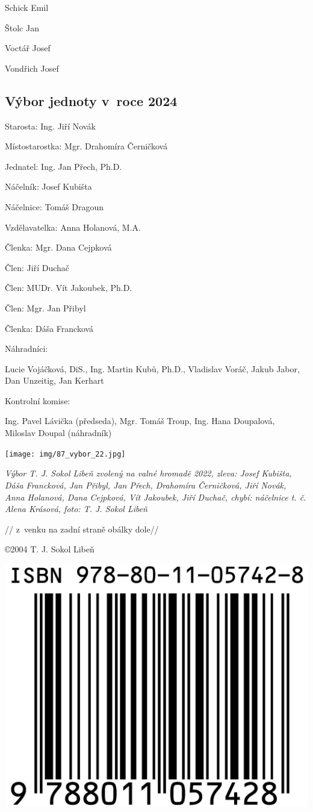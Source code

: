 \documentclass[a5paper, 11pt, twoside]{article}
\begin{document}
Schick Emil

Štolc Jan

Voctář Josef

Vondřich Josef

\subsection{Výbor jednoty v~roce
2024}

Starosta: Ing. Jiří Novák

Místostarostka: Mgr. Drahomíra Černičková

Jednatel: Ing. Jan Přech, Ph.D.

Náčelník: Josef Kubišta

Náčelnice: Tomáš Dragoun

Vzdělavatelka: Anna Holanová, M.A.

Členka: Mgr. Dana Cejpková

Člen: Jiří Duchač

Člen: MUDr. Vít Jakoubek, Ph.D.

Člen: Mgr. Jan Přibyl

Členka: Dáša Francková

Náhradníci:

Lucie Vojáčková, DiS., Ing. Martin Kubů, Ph.D., Vladislav Voráč, Jakub
Jabor, Dan Unzeitig, Jan Kerhart

Kontrolní komise:

Ing. Pavel Lávička (předseda), Mgr. Tomáš Troup, Ing. Hana Doupalová,
Miloslav Doupal (náhradník)

 \texttt{[image: img/87\_vybor\_22.jpg]}

\textit{Výbor T. J. Sokol Libeň zvolený na valné hromadě 2022, zleva:
Josef Kubišta, Dáša Francková, Jan Přibyl, Jan Přech, Drahomíra
Černičková, Jiří Novák, Anna Holanová, Dana Cejpková, Vít Jakoubek, Jiří
Duchač, chybí: náčelnice t. č. Alena Krásová, foto: T. J. Sokol Libeň}

// z~venku na zadní straně obálky dole//

\clearpage
{}
\vspace*{96pt}

\copyright 2004 T. J. Sokol Libeň

 \includegraphics[width=\textwidth]{img/88_isbn.png}

\pagecolor{sokolred}
\color{white}
\end{document}
